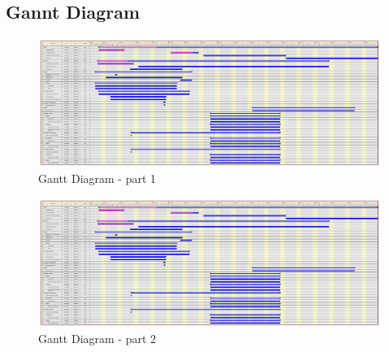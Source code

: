 \subsection{Gannt Diagram}

\begin{figure}[h]
\centering \includegraphics[angle=270, width=1\textwidth, trim=0mm 0mm 47.5cm 0mm, clip]{img/mgmt-gantt.pdf} \caption{Gantt Diagram - part 1}
\label{fig:mgmt-gantt-1}
\end{figure}

\begin{figure}[h]
\centering \includegraphics[angle=270, width=1\textwidth, trim=45.5cm 0mm 0mm 0mm, clip]{img/mgmt-gantt.pdf} \caption{Gantt Diagram - part 2}
\label{fig:mgmt-gantt-2}
\end{figure}
